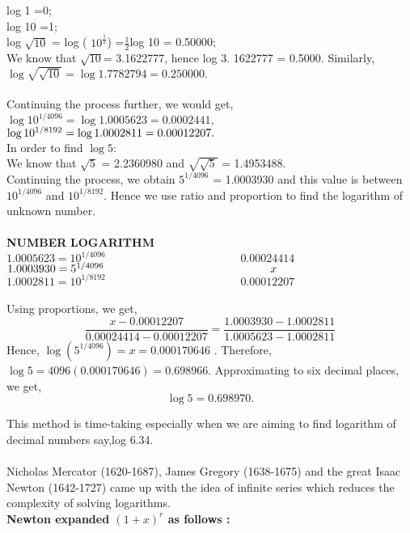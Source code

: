 \documentclass[a4paper,reqno,11pt]{book}
\theoremstyle{plain}%
\theoremstyle{definition}
\begin{document}
\noindent log 1 =0;\\
log 10 =1;\\
log $\sqrt{10}$ = log ( $10^\frac{1}{2}$) =$\frac{1}{2}$log 10 = 0.50000;\\
We know that $\sqrt{10}$= 3.1622777, hence log 3. 1622777 = 0.5000. Similarly,\\
$\log \sqrt{\sqrt{10}}= \log 1.7782794= 0.250000.$\\
\\
Continuing the process further, we would get,\\
$\log 10^{1/4096} = \log 1.0005623 = 0.0002441,$\\
$\log 10^{1/8192} = \log 1.0002811 = 0.00012207.\\$
\\
In order to find $\log 5 $:\\
We know that $ \sqrt{5}$ = 2.2360980 and $\sqrt{\sqrt{5}}$ = 1.4953488.\\
Continuing the process, we obtain $5^{1/4096}$ = 1.0003930 and this value is between $10^{1/4096}$ and $10^{1/8192}.$ Hence we use ratio and proportion to find the logarithm of unknown number.\\
\\
\textbf{NUMBER} \hspace{6.1cm} \textbf{LOGARITHM}\\
$1.0005623 = 10^{1/4096}\hspace{5cm} 0.00024414 $\\
$1.0003930 =  5^{1/4096} \hspace{5.2cm}  x$\\
$1.0002811 = 10^{1/8192}\hspace{5cm} 0.00012207 $\\
\\
Using proportions, we get,\\
$$\frac{x - 0.00012207}{0.00024414 -0.00012207} = \frac{1.0003930-1.0002811} {1.0005623 -1.0002811} $$
 Hence,  $\log(5^{1/4096})
 = x = 0.000170646$ . Therefore, 
$\log 5 = 4096 (0.000170646) = 0.698966 . $ Approximating to six decimal places, we get,\\
$$ \log 5 = 0.698970. $$

\noindent This method is time-taking especially when we are aiming to find logarithm of decimal numbers say,log 6.34. \\
\\
Nicholas Mercator (1620-1687), James Gregory (1638-1675) and the great Isaac Newton (1642-1727) came up with the idea of infinite series which reduces the complexity of solving logarithms.\\
\textbf{Newton expanded $(1 + x)^r$ as follows :}\\
\end{document}
